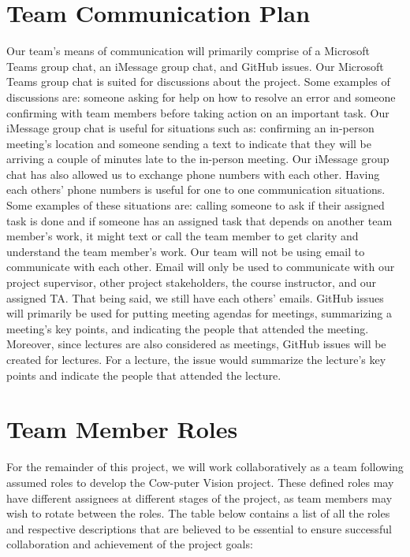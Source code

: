 \documentclass{article}
\begin{document}
\section{Team Communication Plan}
Our team's means of communication will primarily comprise of a Microsoft Teams group chat, an iMessage group chat, and GitHub issues. Our Microsoft Teams group chat is suited for discussions about the project.
Some examples of discussions are: someone asking for help on how to resolve an error and someone confirming with team members before 
taking action on an important task. Our iMessage group chat is useful for situations such as:
confirming an in-person meeting's location and someone sending a text to indicate that they will be arriving a couple of minutes late to the
in-person meeting. Our iMessage group chat has also allowed us to exchange phone numbers with each other.
Having each others' phone numbers is useful for one to one communication situations. Some examples of these situations are:
calling someone to ask if their assigned task is done and 
if someone has an assigned task that depends on another team member's work, it might text or call the team member to get clarity and understand the team member's work.
Our team will not be using email to communicate with each other. Email will only be used to communicate with our project supervisor, other project
stakeholders, the course instructor, and our assigned TA. That being said, we still have each others' emails. GitHub issues will primarily be used for putting meeting agendas for meetings,
summarizing a meeting's key points, and indicating the people that attended the meeting. Moreover, since
lectures are also considered as meetings, GitHub issues will be created for lectures. For a lecture, the issue would
summarize the lecture's key points and indicate the people that attended the lecture.


\section{Team Member Roles}

For the remainder of this project, we will work collaboratively as a team following assumed roles to develop the Cow-puter Vision project. These defined roles may have different assignees at different stages of the project, as team members may wish to rotate between the roles.
The table below contains a list of all the roles and respective descriptions that are believed to be essential to ensure successful collaboration and achievement of the project goals:
\end{document}
